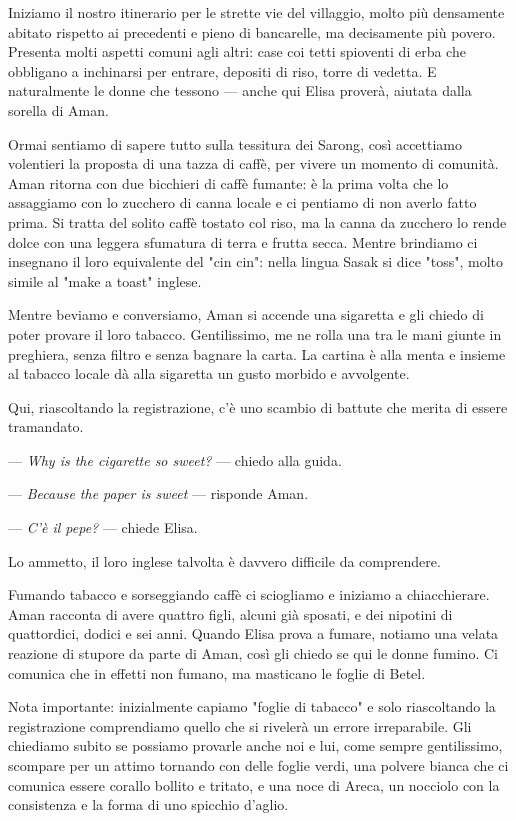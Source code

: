 Iniziamo il nostro itinerario per le strette vie del villaggio, molto più densamente abitato rispetto ai precedenti e pieno di bancarelle, ma decisamente più povero. Presenta molti aspetti comuni agli altri: case coi tetti spioventi di erba che obbligano a inchinarsi per entrare, depositi di riso, torre di vedetta. E naturalmente le donne che tessono — anche qui Elisa proverà, aiutata dalla sorella di Aman.

Ormai sentiamo di sapere tutto sulla tessitura dei Sarong, così accettiamo volentieri la proposta di una tazza di caffè, per vivere un momento di comunità. Aman ritorna con due bicchieri di caffè fumante: è la prima volta che lo assaggiamo con lo zucchero di canna locale e ci pentiamo di non averlo fatto prima. Si tratta del solito caffè tostato col riso, ma la canna da zucchero lo rende dolce con una leggera sfumatura di terra e frutta secca. Mentre brindiamo ci insegnano il loro equivalente del "cin cin": nella lingua Sasak si dice "toss", molto simile al "make a toast" inglese.

Mentre beviamo e conversiamo, Aman si accende una sigaretta e gli chiedo di poter provare il loro tabacco. Gentilissimo, me ne rolla una tra le mani giunte in preghiera, senza filtro e senza bagnare la carta. La cartina è alla menta e insieme al tabacco locale dà alla sigaretta un gusto morbido e avvolgente.

Qui, riascoltando la registrazione, c'è uno scambio di battute che merita di essere tramandato.

— \textit{Why is the cigarette so sweet?} — chiedo alla guida. 

— \textit{Because the paper is sweet} — risponde Aman. 

— \textit{C'è il pepe?} — chiede Elisa.

Lo ammetto, il loro inglese talvolta è davvero difficile da comprendere.

Fumando tabacco e sorseggiando caffè ci sciogliamo e iniziamo a chiacchierare. Aman racconta di avere quattro figli, alcuni già sposati, e dei nipotini di quattordici, dodici e sei anni. Quando Elisa prova a fumare, notiamo una velata reazione di stupore da parte di Aman, così gli chiedo se qui le donne fumino. Ci comunica che in effetti non fumano, ma masticano le foglie di Betel.

Nota importante: inizialmente capiamo "foglie di tabacco" e solo riascoltando la registrazione comprendiamo quello che si rivelerà un errore irreparabile. Gli chiediamo subito se possiamo provarle anche noi e lui, come sempre gentilissimo, scompare per un attimo tornando con delle foglie verdi, una polvere bianca che ci comunica essere corallo bollito e tritato, e una noce di Areca, un nocciolo con la consistenza e la forma di uno spicchio d'aglio.

